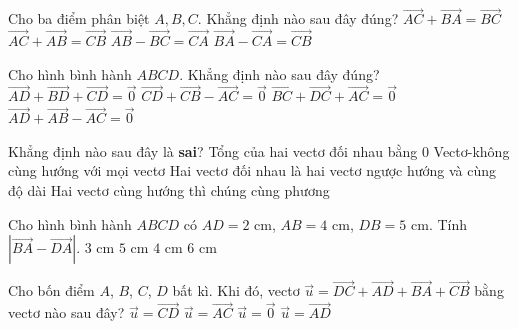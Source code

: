 \begin{ex}%
	Cho ba điểm phân biệt $A, B, C$. Khẳng định nào sau đây đúng?
	\choice
	{\True $\overrightarrow{AC}+\overrightarrow{BA}=\overrightarrow{BC}$}
	{$\overrightarrow{AC}+\overrightarrow{AB}=\overrightarrow{CB}$}
	{$\overrightarrow{AB}-\overrightarrow{BC}=\overrightarrow{CA}$}
	{$\overrightarrow{BA}-\overrightarrow{CA}=\overrightarrow{CB}$}
\end{ex}

\begin{ex}%
	Cho hình bình hành $ABCD$. Khẳng định nào sau đây đúng?
	\choice
	{$\overrightarrow{AD}+\overrightarrow{BD}+\overrightarrow{CD}=\overrightarrow{0}$}
	{$\overrightarrow{CD}+\overrightarrow{CB}-\overrightarrow{AC}=\overrightarrow{0}$}
	{$\overrightarrow{BC}+\overrightarrow{DC}+\overrightarrow{AC}=\overrightarrow{0}$}
	{\True $\overrightarrow{AD}+\overrightarrow{AB}-\overrightarrow{AC}=\overrightarrow{0}$}
\end{ex}

\begin{ex}%
	Khẳng định nào sau đây là {\bf sai}?
	\choice
	{\True Tổng của hai vectơ đối nhau bằng 0}
	{Vectơ-không cùng hướng với mọi vectơ}
	{Hai vectơ đối nhau là hai vectơ ngược hướng và cùng độ dài}
	{Hai vectơ cùng hướng thì chúng cùng phương}
\end{ex}

\begin{ex}%
	Cho hình bình hành $ABCD$ có $AD=2$ cm, $AB=4$ cm, $DB=5$ cm. Tính $\left|\overrightarrow{BA}-\overrightarrow{DA} \right| $.
	\choice
	{$3$ cm}
	{\True $5$ cm}
	{$4$ cm}
	{$6$ cm}
\end{ex}

\begin{ex}%
	Cho bốn điểm $A$, $B$, $C$, $D$ bất kì. Khi đó, vectơ $\overrightarrow{u}=\overrightarrow{DC}+\overrightarrow{AD}+\overrightarrow{BA}+\overrightarrow{CB}$ bằng vectơ nào sau đây?
	\choice
	{$\overrightarrow{u}=\overrightarrow{CD}$}
	{$\overrightarrow{u}=\overrightarrow{AC}$}
	{\True $\overrightarrow{u}=\overrightarrow{0}$}
	{$\overrightarrow{u}=\overrightarrow{AD}$}
\end{ex}

